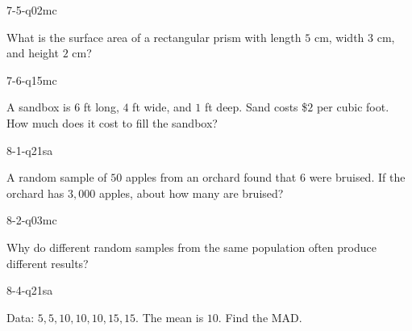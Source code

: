 \begin{practiceQuestion}{7-5-q02}{mc}
\begin{questionText}
What is the surface area of a rectangular prism with length $5$ cm, width $3$ cm, and height $2$ cm?
\end{questionText}
\end{practiceQuestion}

\begin{practiceQuestion}{7-6-q15}{mc}
\begin{questionText}
A sandbox is $6$ ft long, $4$ ft wide, and $1$ ft deep. Sand costs \$$2$ per cubic foot. How much does it cost to fill the sandbox?
\end{questionText}
\end{practiceQuestion}

\begin{practiceQuestion}{8-1-q21}{sa}
\begin{questionText}
A random sample of $50$ apples from an orchard found that $6$ were bruised. If the orchard has $3{,}000$ apples, about how many are bruised?
\end{questionText}
\end{practiceQuestion}

\begin{practiceQuestion}{8-2-q03}{mc}
\begin{questionText}
Why do different random samples from the same population often produce different results?
\end{questionText}
\end{practiceQuestion}

\begin{practiceQuestion}{8-4-q21}{sa}
\begin{questionText}
Data: $5, 5, 10, 10, 10, 15, 15$. The mean is $10$. Find the MAD.
\end{questionText}
\end{practiceQuestion}

